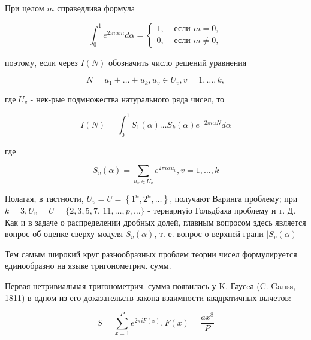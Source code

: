 \documentclass[10pt]{article}
\begin{document}
При целом $m$ справедлива формула



\[

\int_{0}^{1} e^{2 \pi i \alpha m} d \alpha= \begin{cases}1, & \text { если } m=0, \\ 0, & \text { если } m \neq 0,\end{cases}

\]



поэтому, если через $I(N)$ обозначить число решений уравнения



\[

N=u_{1}+\ldots+u_{k}, u_{v} \in U_{v}, v=1, \ldots, k,

\]



где $U_{v}$ - нек-рые подмножества натурального ряда чисел, то



\[

I(N)=\int_{0}^{1} S_{1}(\alpha) \ldots S_{k}(\alpha) e^{-2 \pi i \alpha N} d \alpha

\]



где



\[

S_{v}(\alpha)=\sum_{u_{v} \in U_{v}} e^{2 \pi i \alpha u_{v}}, v=1, \ldots, k

\]



Полагая, в тастности, $U_{v}=U=\left\{1^{n}, 2^{n}, \ldots\right\}$, получают Варинга проблему; при $k=3, U_{v}=U=\{2,3,5,7$, $11, \ldots, p, \ldots\}$ - тернарнуіо Гольдбаха проблему и т. Д. Как и в задаче о распределении дробных долей, главным вопросом здесь является вопрос об оценке сверху модуля $S_{v}(\alpha)$, т. е. вопрос о верхней грани $\left|S_{v}(\alpha)\right|$



Тем самым широкий круг разнообразных проблем теории чисел формулируется единообразно на языке тригонометрич. сумм.



Первая нетривиальная тригонометрич. сумма появилась у K. Гаусcа (C. Gauss, 1811) в одном из его доказательств закона взаимности квадратичных вычетов:



\[

S=\sum_{x=1}^{P} e^{2 \pi i F(x)}, F(x)=\frac{a x^{8}}{P}

\]
\end{document}
